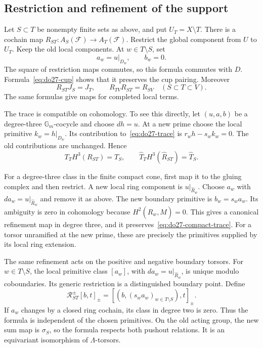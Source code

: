\subsection{Restriction and refinement of the support}

Let \(S\subset T\) be nonempty finite sets as above, and put
\(U_T=X\setminus T\). There is a cochain map
\(R_{ST}:A_S(\mathcal F)\to A_T(\mathcal F)\).
Restrict the global component from \(U\) to \(U_T\).
Keep the old local components. At \(w\in T\setminus S\), set
\[
 a_w=u|_{D_w},\qquad b_w=0.
\]
The square of restriction maps commutes, so this formula commutes
with \(D\). Formula~\eqref{eq:do27-cup} shows that it preserves
the cup pairing. Moreover
\[
 R_{ST}J_S=J_T,\qquad R_{TV}R_{ST}=R_{SV}\quad(S\subset T\subset V).
\]
The same formulas give maps for completed local terms.

The trace is compatible on cohomology. To see this directly, let
\((u,a,b)\) be a degree-three \(\mathbb G_m\)-cocycle and choose
\(dh=u\). At a new prime choose the local primitive
\(k_w=h|_{D_w}\). Its contribution to~\eqref{eq:do27-trace} is
\(r_wh-s_wk_w=0\). The old contributions are unchanged. Hence
\[
 T_T H^3(R_{ST})=T_S,
 \qquad \widehat T_T H^3(\widehat R_{ST})=\widehat T_S.
\]

For a degree-three class in the finite compact cone, first map it
to the gluing complex and then restrict. A new local ring component
is \(u|_{\widehat R_w}\). Choose \(a_w\) with
\(da_w=u|_{\widehat R_w}\) and remove it as above.
The new boundary primitive is \(b_w=s_wa_w\).
Its ambiguity is zero in cohomology because
\(H^2(\widehat R_w,M)=0\). This gives a canonical refinement map
in degree three, and it preserves~\eqref{eq:do27-compact-trace}.
For a torsor unramified at the new prime, these are precisely the
primitives supplied by its local ring extension.

The same refinement acts on the positive and negative boundary torsors.
For \(w\in T\setminus S\), the local primitive class
\([a_w]\), with \(da_w=u|_{\widehat R_w}\), is unique modulo
coboundaries. Its generic restriction is a distinguished boundary
point. Define
\[
 \mathcal R_{ST}^\pm[b,t]_\pm
       =[(b,(s_wa_w)_{w\in T\setminus S}),t]_\pm.
\]
If \(a_w\) changes by a closed ring cochain, its class in degree
two is zero. Thus the formula is independent of the chosen primitives.
On the old acting group, the new sum map is \(\sigma_S\), so the
formula respects both pushout relations. It is an equivariant
isomorphism of \(\Lambda\)-torsors.

